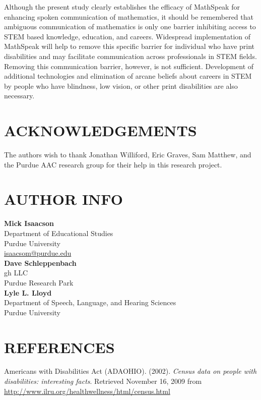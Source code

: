\documentclass[11.5pt]{sig-alternate} %
\begin{document}
\begin{large}
Although the present study clearly establishes the efficacy of MathSpeak for enhancing spoken communication of mathematics, it should be remembered that ambiguous communication of mathematics is only one barrier inhibiting access to STEM based knowledge, education, and careers. Widespread implementation of MathSpeak will help to remove this specific barrier for individual who have print disabilities and may facilitate communication across professionals in STEM fields. Removing this communication barrier, however, is not sufficient. Development of additional technologies and elimination of arcane beliefs about careers in STEM by people who have blindness, low vision, or other print disabilities are also necessary.

\section*{ACKNOWLEDGEMENTS}
The authors wish to thank Jonathan Williford, Eric Graves, Sam Matthew, and the Purdue AAC research group for their help in this research project.

\section*{AUTHOR INFO}
\textbf{Mick Isaacson}\\
Department of Educational Studies\\ 
Purdue University\\
\href{mailto:isaacsom@purdue.edu}{isaacsom@purdue.edu}\\

\textbf{Dave Schleppenbach}\\
gh LLC\\
Purdue Research Park\\

\textbf{Lyle L. Lloyd}\\
Department of Speech, Language, and Hearing Sciences\\
Purdue University\\

\end{large}
\clearpage
\section*{REFERENCES}\par 

\leftskip 0.25in
\parindent -0.25in 
Americans with Disabilities Act (ADAOHIO). (2002). \textit{Census data on people with disabilities: interesting facts}. Retrieved November 16, 2009 from \url{http://www.ilru.org/healthwellness/html/census.html}
\end{document}
